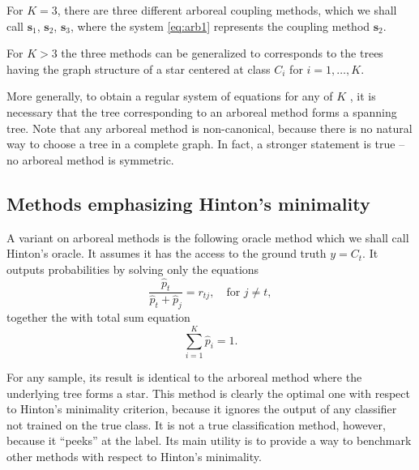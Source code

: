 \documentclass[twoside,11pt]{article}
\begin{document}
For $K=3$, there are three different arboreal coupling methods, which we shall call $\boldsymbol{s}_1$, $\boldsymbol{s}_2$, $\boldsymbol{s}_3$, where the system \eqref{eq:arb1} represents the coupling method $\boldsymbol{s}_2$.

For $K>3$ the three methods can be generalized to corresponds to the trees having the graph structure  of a star centered at class $C_i$ for $i=1, \ldots, K$.

More generally, to obtain a regular system of equations for  any of $K$ , it is necessary that the tree corresponding to an arboreal method forms a spanning tree. Note that any arboreal method is non-canonical, because there is no natural way to choose a tree in a complete graph. In fact, a stronger statement is true -- no arboreal method is symmetric.



\subsection{Methods emphasizing Hinton's minimality}

A variant on arboreal methods is the following oracle method which we shall call Hinton's oracle. It  assumes it has the access to the ground truth $y = C_t$. It outputs probabilities by solving only the equations
$$
\frac{\hat p_t}{\hat p_t + \hat p_j} = {r}_{tj},\quad \textrm{for }j\not = t,
$$
together the  with total sum equation
$$
\sum_{i=1}^K  \hat p_i = 1.
$$

For any sample, its result is identical to the arboreal method where the underlying tree forms a star. This method is clearly the optimal one with respect to Hinton's minimality criterion, because it ignores the output of any classifier not trained on the true class. It is not a true classification method, however, because it ``peeks'' at the label. Its main utility is to provide a way to benchmark other methods with respect to Hinton's minimality.
\end{document}

